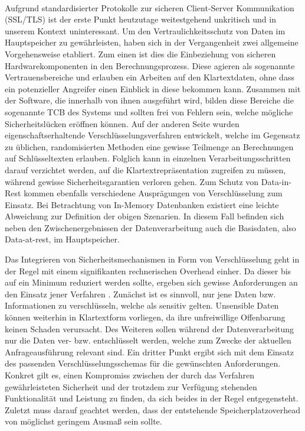 \paragraph{}
Aufgrund standardisierter Protokolle zur sicheren Client-Server Kommunikation (\acs{SSL}/\acs{TLS}) ist der erste Punkt heutzutage weitestgehend unkritisch und in unserem Kontext uninteressant. Um den Vertraulichkeitsschutz von Daten im Hauptspeicher zu gewährleisten, haben sich in der Vergangenheit zwei allgemeine Vorgehensweise etabliert. Zum einen ist dies die Einbeziehung von sicheren Hardwarekomponenten in den Berechnungsprozess. Diese agieren als sogenannte Vertrauensbereiche und erlauben ein Arbeiten auf den Klartextdaten, ohne dass ein potenzieller Angreifer einen Einblick in diese bekommen kann. Zusammen mit der Software, die innerhalb von ihnen ausgeführt wird, bilden diese Bereiche die sogenannte \ac{TCB} des Systems und sollten frei von Fehlern sein, welche mögliche Sicherheitslücken eröffnen können. Auf der anderen Seite wurden eigenschaftserhaltende Verschlüsselungsverfahren entwickelt, welche im Gegensatz zu üblichen, randomisierten Methoden eine gewisse Teilmenge an Berechnungen auf Schlüsseltexten erlauben. Folglich kann in einzelnen Verarbeitungsschritten darauf verzichtet werden, auf die Klartextrepräsentation zugreifen zu müssen, während gewisse Sicherheitsgarantien verloren gehen. Zum Schutz von Data-in-Rest kommen ebenfalls verschiedene Ausprägungen von Verschlüsselung zum Einsatz. Bei Betrachtung von In-Memory Datenbanken existiert eine leichte Abweichung zur Definition der obigen Szenarien. In diesem Fall befinden sich neben den Zwischenergebnissen der Datenverarbeitung auch die Basisdaten, also Data-at-rest, im Hauptspeicher.

Das Integrieren von Sicherheitsmechanismen in Form von Verschlüsselung geht in der Regel mit einem signifikanten rechnerischen Overhead einher. Da dieser bis auf ein Minimum reduziert werden sollte, ergeben sich gewisse Anforderungen an den Einsatz jener Verfahren \cite{Shmueli2010}. Zunächst ist es sinnvoll, nur jene Daten bzw. Informationen zu verschlüsseln, welche als sensitiv gelten. Unsensible Daten können weiterhin in Klartextform vorliegen, da ihre unfreiwillige Offenbarung keinen Schaden verursacht. Des Weiteren sollen während  der Datenverarbeitung nur die Daten ver- bzw. entschlüsselt werden, welche zum Zwecke der aktuellen Anfrageausführung relevant sind. Ein dritter Punkt ergibt sich mit dem Einsatz des passenden Verschlüsselungsschemas für die gewünschten Anforderungen. Konkret gilt es, einen Kompromiss zwischen der durch das Verfahren gewährleisteten Sicherheit und der trotzdem zur Verfügung stehenden Funktionalität und Leistung zu finden, da sich beides in der Regel entgegensteht. Zuletzt muss darauf geachtet werden, dass der entstehende Speicherplatzoverhead von möglichst geringem Ausmaß sein sollte.

